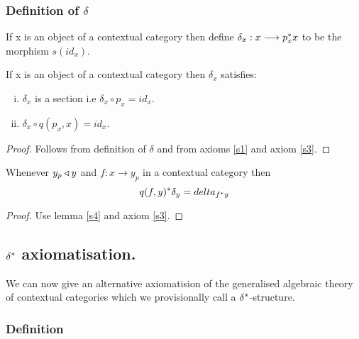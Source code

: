 \documentclass[10pt,a4paper]{scrartcl}
\begin{document}
\subsubsection {Definition of $\delta$}

If x is an object of a contextual category  then define $\delta_x: x \longrightarrow p_x ^* x$ to be
the morphism $s(id_x)$.

\begin{lemma}
\label {deltalemma}
If x is an object of a contextual category  then $\delta_x$ satisfies:
\begin{enumerate}[(i)]
\item $\delta_x$ is a section i.e $\delta_x \circ p_x = id_x$.
\item $\delta_x \circ q(p_x,x) = id_x$.
\end{enumerate}
\end{lemma}
\begin{proof}
Follows from definition of $\delta$ and from axioms \ref{s1} and axiom \ref{s3}.
\end{proof}


\begin{lemma}
\label {deltalemma2}
Whenever $y_p \triangleleft y$ and
$f: x \longrightarrow y_p$ in a contextual category  then 
\begin{equation*}
q(f,y) ^* \delta_y   = delta_{f ^* y}
\end{equation*}
\end{lemma}
\begin{proof}
Use lemma \ref{s4} and axiom \ref{s3}.
\end{proof}


\subsection{$\delta^*$ axiomatisation.}
We can now give an alternative axiomatision of the generalised algebraic theory of contextual categories which we provisionally call a $\delta^*$-structure. 

\subsubsection{Definition}
\end{document}
